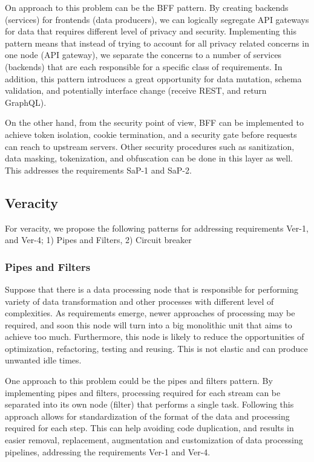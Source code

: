 \documentclass[a4paper,11pt,article,oneside]{memoir}
\begin{document}
On approach to this problem can be the BFF pattern. By creating backends (services) for frontends (data producers), we can logically segregate API gateways for data that requires different level of privacy and security. Implementing this pattern means that instead of trying to account for all privacy related concerns in one node (API gateway), we separate the concerns to a number of services (backends) that are each responsible for a specific class of requirements. In addition, this pattern introduces a great opportunity for data mutation, schema validation, and potentially interface change (receive REST, and return GraphQL).

On the other hand, from the security point of view, BFF can be implemented to achieve token isolation, cookie termination, and a security gate before requests can reach to upstream servers. Other security procedures such as sanitization, data masking, tokenization, and obfuscation can be done in this layer as well. This addresses the requirements SaP-1 and SaP-2. 


\subsection{Veracity}

For veracity, we propose the following patterns for addressing requirements Ver-1, and Ver-4; 1) Pipes and Filters, 2) Circuit breaker 

\subsubsection{Pipes and Filters}

Suppose that there is a data processing node that is responsible for performing variety of data transformation and other processes with different level of complexities. As requirements emerge, newer approaches of processing may be required, and soon this node will turn into a big monolithic unit that aims to achieve too much. Furthermore, this node is likely to reduce the opportunities of optimization, refactoring, testing and reusing. This is not elastic and can produce unwanted idle times. 

One approach to this problem could be the pipes and filters pattern. By implementing pipes and filters, processing required for each stream can be separated into its own node (filter) that performs a single task. Following this approach allows for standardization of the format of the data and processing required for each step. This can help avoiding code duplication, and results in easier removal, replacement, augmentation and customization of data processing pipelines, addressing the requirements Ver-1 and Ver-4.
\end{document}
